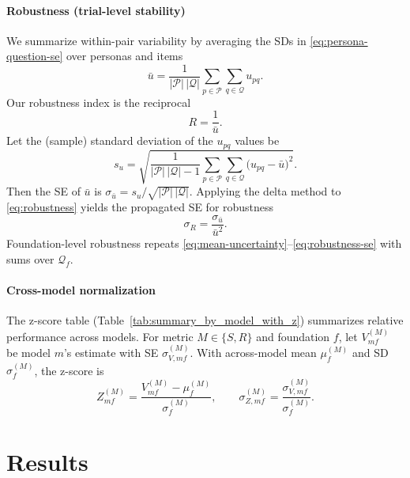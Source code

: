 \documentclass{article}
\begin{document}
\paragraph{Robustness (trial-level stability)} We summarize within-pair variability by averaging the SDs in \eqref{eq:persona-question-se} over personas and items
\begin{equation}
  \bar{u} = \frac{1}{|\mathcal{P}|\,|\mathcal{Q}|} \sum_{p \in \mathcal{P}} \sum_{q \in \mathcal{Q}} u_{pq}.\label{eq:mean-uncertainty}
\end{equation}
Our robustness index is the reciprocal
\begin{equation}
  R = \frac{1}{\bar{u}}.\label{eq:robustness}
\end{equation}
Let the (sample) standard deviation of the \(u_{pq}\) values be
\begin{equation}
  s_u = \sqrt{\frac{1}{|\mathcal{P}|\,|\mathcal{Q}| - 1} \sum_{p \in \mathcal{P}} \sum_{q \in \mathcal{Q}} \Big(u_{pq} - \bar{u}\Big)^2}.\label{eq:uncertainty-sd}
\end{equation}
Then the SE of \(\bar{u}\) is \(\sigma_{\bar{u}} = s_u / \sqrt{|\mathcal{P}|\,|\mathcal{Q}|}\). Applying the delta method to \eqref{eq:robustness} yields the propagated SE for robustness
\begin{equation}
  \sigma_R = \frac{\sigma_{\bar{u}}}{\bar{u}^2}.\label{eq:robustness-se}
\end{equation}
Foundation-level robustness repeats \eqref{eq:mean-uncertainty}--\eqref{eq:robustness-se} with sums over \(\mathcal{Q}_f\).

\paragraph{Cross-model normalization} The z-score table (Table~\ref{tab:summary_by_model_with_z}) summarizes relative performance across models. For metric \(M \in \{S,R\}\) and foundation \(f\), let \(V_{mf}^{(M)}\) be model \(m\)'s estimate with SE \(\sigma_{V, mf}^{(M)}\). With across-model mean \(\mu_f^{(M)}\) and SD \(\sigma_f^{(M)}\), the z-score is
\begin{equation}
  Z_{mf}^{(M)} = \frac{V_{mf}^{(M)} - \mu_f^{(M)}}{\sigma_f^{(M)}},\qquad
  \sigma_{Z, mf}^{(M)} = \frac{\sigma_{V, mf}^{(M)}}{\sigma_f^{(M)}}.\label{eq:zscore}
\end{equation}



\section{Results}
\end{document}
